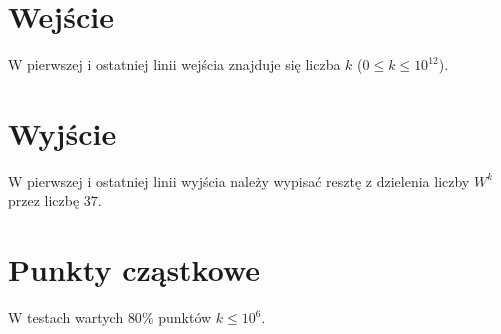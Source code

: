 \documentclass[zad,zawodnik,utf8]{sinol}
\begin{document}
\begin{tasktext}
  	\section{Wejście}
W pierwszej i ostatniej linii wejścia znajduje się liczba $k$ ($0 \leq k \leq 10^{12}$).
	\section{Wyjście}
W pierwszej i ostatniej linii wyjścia należy wypisać resztę z dzielenia liczby $W^{k}$ przez liczbę $37$.
	\makecompactexample
	\section{Punkty cząstkowe}
	W testach wartych $80\%$ punktów $k \leq 10^6$.

\end{tasktext}
\end{document}

